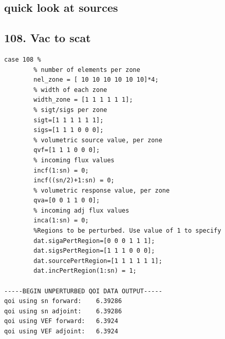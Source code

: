 \documentclass{article}
\begin{document}
\subsection{quick look at sources}
\subsection{108. Vac to scat}
\begin{verbatim}
case 108 %
        % number of elements per zone
        nel_zone = [ 10 10 10 10 10 10]*4;
        % width of each zone
        width_zone = [1 1 1 1 1 1];
        % sigt/sigs per zone
        sigt=[1 1 1 1 1 1];
        sigs=[1 1 1 0 0 0];
        % volumetric source value, per zone
        qvf=[1 1 1 0 0 0];
        % incoming flux values
        incf(1:sn) = 0;
        incf((sn/2)+1:sn) = 0;
        % volumetric response value, per zone
        qva=[0 0 1 1 0 0];
        % incoming adj flux values
        inca(1:sn) = 0;
        %Regions to be perturbed. Use value of 1 to specify
        dat.sigaPertRegion=[0 0 0 1 1 1];
        dat.sigsPertRegion=[1 1 1 0 0 0];
        dat.sourcePertRegion=[1 1 1 1 1 1];
        dat.incPertRegion(1:sn) = 1; 
        
-----BEGIN UNPERTURBED QOI DATA OUTPUT----- 
qoi using sn forward: 	 6.39286 
qoi using sn adjoint: 	 6.39286 
qoi using VEF forward: 	 6.3924 
qoi using VEF adjoint: 	 6.3924 
\end{verbatim}
\end{document}
